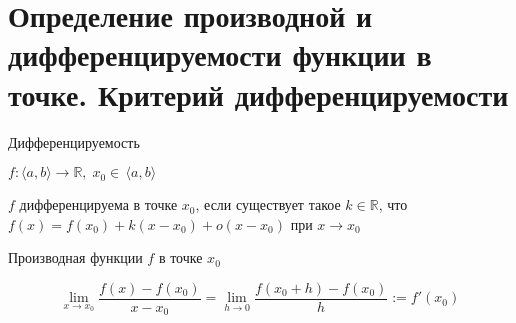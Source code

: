 \section{Определение производной и дифференцируемости функции в точке. Критерий дифференцируемости}
\begin{conj}
    Дифференцируемость

    $f: \langle a, b \rangle \to \mathbb{R}, \; x_0 \in \, \langle a, b \rangle$

    $f$ дифференцируема в точке $x_0$, если существует такое $k \in \mathbb{R}$, 
    что $f(x) = f(x_0) + k(x - x_0) + o(x - x_0)$ при $x \to x_0$
\end{conj}

\begin{conj}
    Производная функции $f$ в точке $x_0$

    \[ \lim_{x \to x_0} \frac{f(x) - f(x_0)}{x - x_0} = \lim_{h \to 0} \frac{f(x_0 + h) - f(x_0)}{h}
    := f'(x_0) \]
\end{conj}

